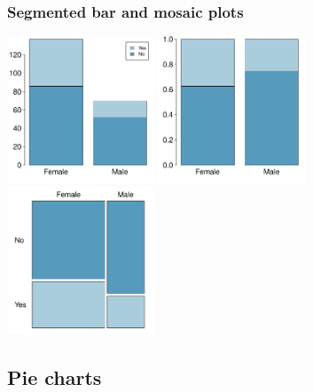 \begin{frame}
\frametitle{Segmented bar and mosaic plots}


\begin{center}
\includegraphics[width=0.33\textwidth]{1-7_categorical_data/figures/gender_spouse/gender_seg_bar}
\includegraphics[width=0.33\textwidth]{1-7_categorical_data/figures/gender_spouse/gender_rel_seg_bar}
\includegraphics[width=0.33\textwidth]{1-7_categorical_data/figures/gender_spouse/gender_mosaic}
\end{center}

\end{frame}


\subsection{Pie charts}


